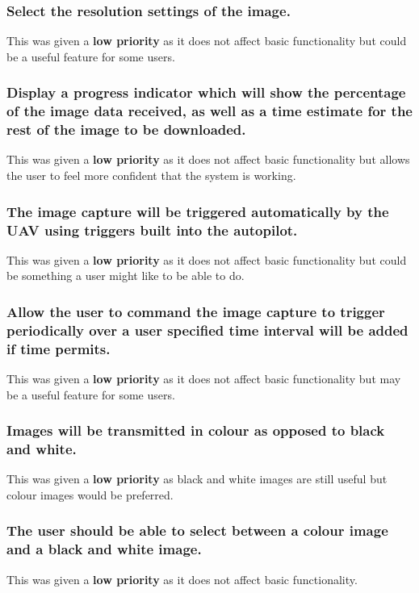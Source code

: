 		\subsubsection{Select the \textbf{resolution settings} of the image.} \label{sec:spec_i} 
This was given a \textbf{low priority} as it does not affect basic functionality but could be a useful feature for some users.
		\subsubsection{Display a progress indicator which will show the percentage of the image data received, as well as a time estimate for the rest of the image to be downloaded.} \label{sec:spec_j} 
This was given a \textbf{low priority} as it does not affect basic functionality but allows the user to feel more confident that the system is working.
		\subsubsection{The image capture will be triggered automatically by the UAV using triggers built into the autopilot.} \label{sec:spec_k} 
This was given a \textbf{low priority} as it does not affect basic functionality but could be something a user might like to be able to do.
		\subsubsection{Allow the user to command the image capture to \textbf{trigger periodically} over a \textbf{user specified time interval} will be added if time permits.} \label{sec:spec_l} 
This was given a \textbf{low priority} as it does not affect basic functionality but may be a useful feature for some users.
	\subsubsection{Images will be transmitted in \textbf{colour} as opposed to black and white.} \label{sec:spec_m} 
This was given a \textbf{low priority} as black and white images are still useful but colour images would be preferred.
	\subsubsection{The user should be able to select between a colour image and a black and white image.} \label{sec:spec_n} 
This was given a \textbf{low priority} as it does not affect basic functionality.



